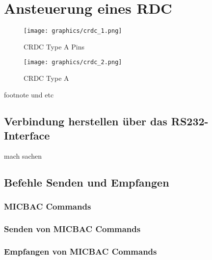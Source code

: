 \chapter{Ansteuerung eines RDC}
\label{ch:micbac}


\begin{figure}[H]
	\begin{minipage}{0.5\textwidth}
		\centering
		\texttt{[image: graphics/crdc\_1.png]}
		\caption{CRDC Type A Pins}
		\label{fig:crdc-pins}
	\end{minipage}
	\begin{minipage}{0.5\textwidth}
		\centering
		\texttt{[image: graphics/crdc\_2.png]}
		\caption{CRDC Type A}
		\label{fig:crdc_top}
	\end{minipage}
\end{figure}



footnote und etc

\section{Verbindung herstellen über das RS232-Interface}
\label{sec:rs232-connection}

mach sachen

\section{Befehle Senden und Empfangen}
\label{sec:com-send-receive}

\subsection{MICBAC Commands}
\label{subsec:micbac-commands}

\subsection{Senden von MICBAC Commands}
\label{subsec:send-micbac}



\subsection{Empfangen von MICBAC Commands}
\label{subsec:receive-micbac}

